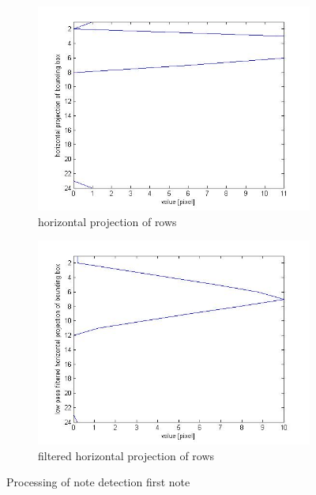 \begin{figure}[htbp]
\begin{subfigure}[c]{0.4\textwidth}
        \includegraphics[width=\textwidth]{1e.jpg}
        \caption{horizontal projection of rows}
  \end{subfigure}
  \begin{subfigure}[c]{0.4\textwidth}
        \includegraphics[width=\textwidth]{1f.jpg}
        \caption{filtered horizontal projection of rows}
  \end{subfigure}
	\caption{Processing of note detection first note}
	\label{fig:noteValues1}
\end{figure}


